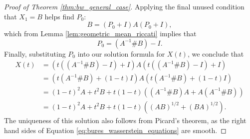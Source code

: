 \documentclass{amsart}
\theoremstyle{definition}
\theoremstyle{remark}
\numberwithin{equation}{section}
\begin{document}
\begin{proof}[Proof of Theorem \ref{thm:bw_general_case}]
Applying the final unused condition that $X_1 = B$ helps find $P_0$:
\begin{equation}
    B = (P_0 + I) A (P_0 + I),
\end{equation}
which from Lemma \ref{lem:geometric_mean_riccati} implies that
\begin{equation}
    P_0 = (A^{-1} \# B) - I.
\end{equation}
Finally, substituting $P_0$ into our solution formula for $X(t)$, we conclude that
\begin{align}
    X(t) &= (t((A^{-1} \# B) - I) + I) A (t((A^{-1} \# B) - I) + I) \\
    &= (t(A^{-1} \# B) + (1-t)I) A (t(A^{-1} \# B) + (1-t)I)\\
    &= (1-t)^2 A + t^2 B + t(1-t)((A^{-1}\#B)A + A(A^{-1}\#B))\\
    &= (1-t)^2 A + t^2 B + t(1-t)\left((AB)^{1/2} + (BA)^{1/2}\right).
\end{align}
The uniqueness of this solution also follows from Picard's theorem, as the right hand sides of Equation \ref{eq:bures_wasserstein_equations} are smooth.
\end{proof}
\end{document}
